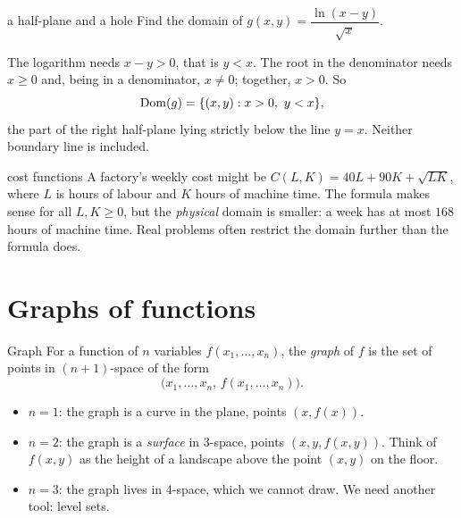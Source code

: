 \begin{example}{a half-plane and a hole}
Find the domain of $g(x,y)=\dfrac{\ln(x-y)}{\sqrt{x}}$.

The logarithm needs $x-y>0$, that is $y<x$. The root in the denominator needs $x\ge 0$
and, being in a denominator, $x\neq 0$; together, $x>0$. So
\[ \Dom(g)=\{(x,y): x>0,\ y<x\}, \]
the part of the right half-plane lying strictly below the line $y=x$. Neither boundary
line is included.
\end{example}

\begin{reallife}{cost functions}
A factory's weekly cost might be $C(L,K)=40L+90K+\sqrt{LK}$, where $L$ is hours of labour
and $K$ hours of machine time. The formula makes sense for all $L,K\ge 0$, but the
\emph{physical} domain is smaller: a week has at most $168$ hours of machine time. Real
problems often restrict the domain further than the formula does.
\end{reallife}

\section{Graphs of functions}

\begin{definition}{Graph}
For a function of $n$ variables $f(x_1,\dots,x_n)$, the \emph{graph} of $f$ is the set of
points in $(n+1)$-space of the form
\[ \big(x_1,\dots,x_n,\,f(x_1,\dots,x_n)\big). \]
\end{definition}

\begin{itemize}
  \item $n=1$: the graph is a curve in the plane, points $(x,f(x))$.
  \item $n=2$: the graph is a \emph{surface} in $3$-space, points $(x,y,f(x,y))$. Think
  of $f(x,y)$ as the height of a landscape above the point $(x,y)$ on the floor.
  \item $n=3$: the graph lives in $4$-space, which we cannot draw. We need another tool:
  level sets.
\end{itemize}

